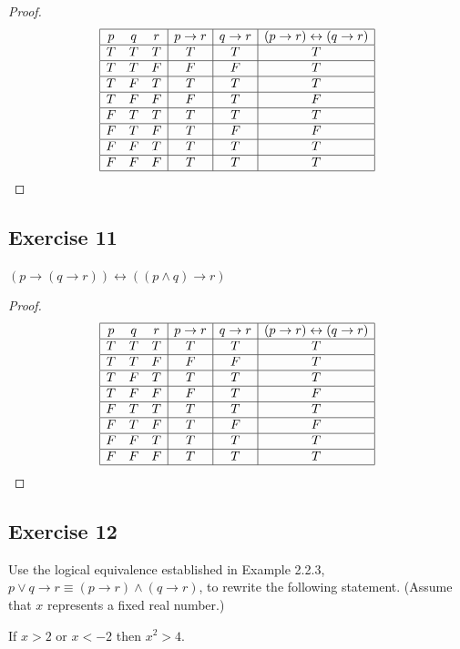 \documentclass[14pt]{extarticle}
\newcommand{\bic}{\leftrightarrow}
\begin{document}
\begin{proof}
$$
\begin{array}{|ccc|c|c|c|}
\hline
p & q & r & p \to r & q \to r & (p \to r) \bic (q \to r) \\
\hline
T & T & T & T & T & T \\
\hline
T & T & F & F & F & T \\
\hline
T & F & T & T & T & T \\
\hline
T & F & F & F & T & F \\
\hline
F & T & T & T & T & T \\
\hline
F & T & F & T & F & F \\
\hline
F & F & T & T & T & T \\
\hline
F & F & F & T & T & T \\
\hline
\end{array}
$$
\end{proof}

\subsection{Exercise 11}
$(p \to (q \to r)) \bic ((p \wedge q) \to r)$

\begin{proof}
$$
\begin{array}{|ccc|c|c|c|}
\hline
p & q & r & p \to r & q \to r & (p \to r) \bic (q \to r) \\
\hline
T & T & T & T & T & T \\
\hline
T & T & F & F & F & T \\
\hline
T & F & T & T & T & T \\
\hline
T & F & F & F & T & F \\
\hline
F & T & T & T & T & T \\
\hline
F & T & F & T & F & F \\
\hline
F & F & T & T & T & T \\
\hline
F & F & F & T & T & T \\
\hline
\end{array}
$$
\end{proof}

\subsection{Exercise 12}
Use the logical equivalence established in Example 2.2.3, $p \vee q \to r \equiv (p \to r) \wedge (q \to r)$, to rewrite the
following statement. (Assume that $x$ represents a fixed real number.)
\begin{center}
If $x > 2$ or $x < -2$ then $x^2 > 4$.
\end{center}
\end{document}
